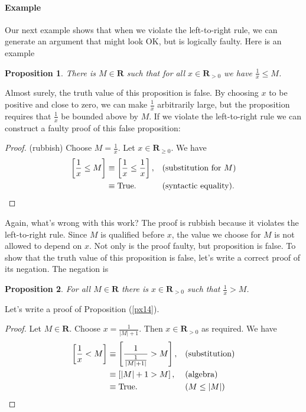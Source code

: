 \documentclass[12pt,fleqn]{article}
\newcommand{\reals}{\mathbf{R}}
\newcommand{\true}{\mathrm{True}}
\newenvironment{myproof}
  {\begin{shaded}\begin{proof}}
  {\end{proof}\end{shaded}}
\newtheorem{prop}{Proposition}
\newcounter{ex}\setcounter{ex}{0}
\newcommand{\ex}{%
\setcounter{ex}{\value{ex}+1}
\paragraph{Example \theex}}
\begin{document}
\ex Our next example  shows that when we violate the left-to-right rule, we can generate an  argument that might look OK, but 
is logically faulty.  Here is an example

\begin{prop} There is $M \in \reals$ such that for all $x \in \reals_{>0}$ we have  $\frac{1}{x} \leq M$.  
\end{prop}

Almost surely, the truth value of this proposition is false. By choosing $x$ to be positive and close to zero,  we can make $\frac{1}{x}$ 
arbitrarily large, but the proposition requires that  $\frac{1}{x}$   be bounded above by $M$. If we violate the left-to-right rule
we can construct a faulty proof of this false proposition:

\begin{myproof} (rubbish) Choose $M = \frac{1}{x}$. Let  $x \in \reals_{\geq 0}$. We have
\begin{align*}
 \left[\frac{1}{x}  \leq M  \right] &\equiv
 \left[\frac{1}{x}  \leq  \frac{1}{x}  \right],  &&\mbox{(substitution for $M$)} \\
 &\equiv \mbox{True}. &&\mbox{(syntactic equality)}.   \qedhere
\end{align*}
\end{myproof}
\noindent Again, what's wrong with this work?   The proof is rubbish because it violates  the left-to-right rule.  Since $M$ is qualified before $x$,
  the value we choose for $M$ is not allowed to depend on $x$. Not only is the proof faulty, but proposition is false.  To show that the 
  truth value of this proposition is false, let's write a correct proof of its negation.  The negation  is 

\begin{prop} For all $M \in \reals$  there is $x \in \reals_{>0}$ such that $\frac{1}{x} >  M$.  \label{p7} \end{prop}

Let's write a proof of  Proposition (\ref{px14}).

\begin{myproof} Let $M \in \reals$.  Choose $x  = \frac{1}{|M| + 1 }$. Then  $x \in \reals_{>0}$ as required.  We have
\begin{align*}
  \left [ \frac{1}{x} < M \right] &\equiv \left[  \frac{1}{\frac{1}{|M| + 1|} } > M   \right], &&\text{(substitution)} \\
                                                      &\equiv \left[|M| + 1 > M \right], &&\text{(algebra)} \\
                                                      &\equiv \true.  &&( M \leq |M|) \qedhere
\end{align*}
\end{myproof}                                   
\end{document}
